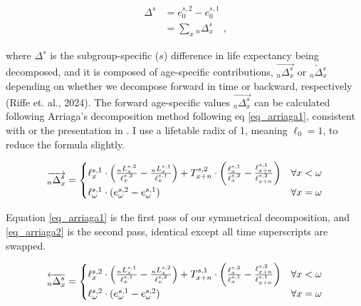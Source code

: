 \documentclass[sn-apa,pdflatex]{sn-jnl}
\theoremstyle{remark}
\theoremstyle{definition}
\begin{document}
\begin{align}
\label{eq_kit_e0}
\Delta^s &= e_0^{s,2} - e_0^{s,1}  \\
 &= \sum _x {}_n\Delta_x^s \quad \textrm{,}\nonumber 
\end{align}

\noindent where \(\Delta^s\) is the subgroup-specific (\(s\)) difference
in life expectancy being decomposed, and it is composed of age-specific
contributions, \(\overrightarrow{{}_n\Delta_x^s}\) or
\(\overleftarrow{{}_n\Delta_x^s}\) depending on whether we decompose
forward in time or backward, respectively (Riffe et. al., 2024). The
forward age-specific values \(\overrightarrow{{}_n\Delta_x^s}\) can be
calculated following Arriaga's decomposition method following eq
\eqref{eq_arriaga1}, consistent with \citet{arriaga1984measuring} or the
presentation in \citet{preston2000demography}. I use a lifetable radix
of 1, meaning \(\ell_0 = 1\), to reduce the formula slightly.

\begin{equation}
\label{eq_arriaga1}
 \overrightarrow{{}_n\Delta_x^s} = \begin{cases}\ell_x^{s,1} \cdot \left( \frac{{}_nL_x^{s,2}}{\ell_x^{s,2}} - \frac{{}_nL_x^{s,1}}{\ell_x^{s,1}}\right)+T_{x+n}^{s,2}\cdot\left(\frac{\ell_x^{s,1}}{\ell_x^{s,2}} - \frac{\ell_{x+n}^{s,1}}{\ell_{x+n}^{s,2}}\right)  & \text{$ \forall x < \omega$}  \\
  \ell_\omega ^{s,1} \cdot (e_\omega^{s,2} -e_\omega^{s,1} ) & \text{$\forall x = \omega $}
  \end{cases}
\end{equation}

Equation \eqref{eq_arriaga1} is the first pass of our symmetrical
decomposition, and \eqref{eq_arriaga2} is the second pass, identical
except all time superscripts are swapped.

\begin{equation}
\label{eq_arriaga2}
 \overleftarrow{{}_n\Delta_x^s} = \begin{cases}\ell_x^{s,2} \cdot \left( \frac{{}_nL_x^{s,1}}{\ell_x^{s,1}} - \frac{{}_nL_x^{s,2}}{\ell_x^{s,2}}\right)+T_{x+n}^{s,1}\cdot\left(\frac{\ell_x^{s,2}}{\ell_x^{s,1}} - \frac{\ell_{x+n}^{s,2}}{\ell_{x+n}^{s,1}}\right)  & \text{$ \forall x < \omega$}  \\
  \ell_\omega ^{s,2} \cdot (e_\omega^{s,1} -e_\omega^{s,2} ) & \text{$\forall x = \omega $}
  \end{cases}
\end{equation}
\end{document}
